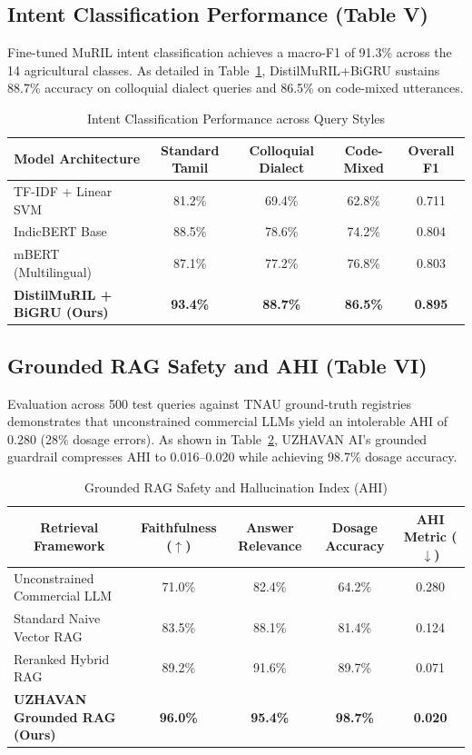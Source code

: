 \documentclass[conference]{IEEEtran}
\begin{document}
\subsection{Intent Classification Performance (Table V)}
Fine-tuned MuRIL intent classification achieves a macro-F1 of 91.3\% across the 14 agricultural classes. As detailed in Table~\ref{tab:intent_classification}, DistilMuRIL+BiGRU sustains 88.7\% accuracy on colloquial dialect queries and 86.5\% on code-mixed utterances.

\begin{table}[t]
\centering
\caption{Intent Classification Performance across Query Styles}
\label{tab:intent_classification}
\begin{tabular}{|l|c|c|c|c|}
\hline
\multicolumn{1}{|c|}{\textbf{Model Architecture}} & \textbf{Standard Tamil} & \textbf{Colloquial Dialect} & \textbf{Code-Mixed} & \textbf{Overall F1} \\
\hline
TF-IDF + Linear SVM               & 81.2\% & 69.4\% & 62.8\% & 0.711 \\
\hline
IndicBERT Base                    & 88.5\% & 78.6\% & 74.2\% & 0.804 \\
\hline
mBERT (Multilingual)              & 87.1\% & 77.2\% & 76.8\% & 0.803 \\
\hline
\textbf{DistilMuRIL + BiGRU (Ours)} & \textbf{93.4\%} & \textbf{88.7\%} & \textbf{86.5\%} & \textbf{0.895} \\
\hline
\end{tabular}
\end{table}

\subsection{Grounded RAG Safety and AHI (Table VI)}
Evaluation across 500 test queries against TNAU ground-truth registries demonstrates that unconstrained commercial LLMs yield an intolerable AHI of 0.280 (28\% dosage errors). As shown in Table~\ref{tab:rag_safety}, UZHAVAN AI's grounded guardrail compresses AHI to 0.016--0.020 while achieving 98.7\% dosage accuracy.

\begin{table}[t]
\centering
\caption{Grounded RAG Safety and Hallucination Index (AHI)}
\label{tab:rag_safety}
\begin{tabular}{|l|c|c|c|c|}
\hline
\multicolumn{1}{|c|}{\textbf{Retrieval Framework}} & \textbf{Faithfulness ($\uparrow$)} & \textbf{Answer Relevance} & \textbf{Dosage Accuracy} & \textbf{AHI Metric ($\downarrow$)} \\
\hline
Unconstrained Commercial LLM      & 71.0\% & 82.4\% & 64.2\% & 0.280 \\
\hline
Standard Naive Vector RAG         & 83.5\% & 88.1\% & 81.4\% & 0.124 \\
\hline
Reranked Hybrid RAG               & 89.2\% & 91.6\% & 89.7\% & 0.071 \\
\hline
\textbf{UZHAVAN Grounded RAG (Ours)} & \textbf{96.0\%} & \textbf{95.4\%} & \textbf{98.7\%} & \textbf{0.020} \\
\hline
\end{tabular}
\end{table}
\end{document}
